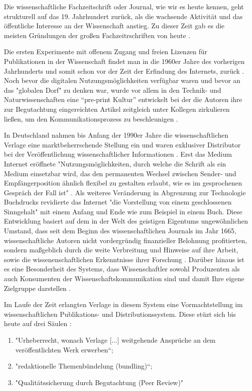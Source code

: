 Die wissenschaftliche Fachzeitschrift oder Journal, wie wir es heute kennen, geht strukturell auf das 19. Jahrhundert zurück, als die wachsende Aktivität und das öffentliche Interesse an der Wissenschaft anstieg. Zu dieser Zeit gab es die meisten Gründungen der großen Fachzeitrschriften von heute \cite{porter_1964_scientific}.

Die ersten Experimente mit offenem Zugang und freien Lizenzen für Publikationen in der Wissenschaft findet man in die 1960er Jahre des vorherigen Jahrhunderts und somit schon vor der Zeit der Erfindung des Internets, zurück \cite{cite:18b}. Noch bevor die digitalen Nutzungsmöglichkeiten verfügbar waren und bevor an das "globalen Dorf"\cite{mcluhan_1962_gutenberg} zu denken war, wurde vor allem in den Technik- und Naturwissenschaften eine “pre-print Kultur” entwickelt bei der die Autoren ihre zur Begutachtung eingereichten Artikel zeitgleich unter Kollegen zirkulieren ließen, um den Kommunikationsprozess zu beschleunigen \cite{suchen-Hoffmann-Zugang-undVerwertung-öffentlicher-Informationen}. 

In Deutschland nahmen bis Anfang der 1990er Jahre die wissenschaftlichen Verlage eine marktbeherrschende Stellung ein und waren exklusiver Distributor bei der Veröffentlichung wissenschaftlicher Informationen \cite{schloegl_2005} \cite{offhaus_2012_institutionelle_repos}. Erst das Medium Internet eröffnete "Nutzungsmöglichkeiten, durch welche die Schrift als ein Medium einsetzbar wird, das den permanenten Wechsel zwischen Sender- und Empfängerposition ähnlich flexibel zu gestalten erlaubt, wie es im gesprochenen Gespräch der Fall ist" \cite{sandbothe_2000_pragmatische}. Als weiteres Veränderung in Abgrenzung zur Technologie Buchdrucks revidierte das Internet "die Vorstellung von einem geschlossenen Sinngehalt" \cite{sandbothe_2000_pragmatische} mit einem Anfang und Ende wie zum Beispiel in einem Buch. Diese Entwicklung basiert auf dem in der Welt des geistigen Eigentums ungewöhnlichen Umstand, dass seit dem Beginn des wissenschaftlichen Journals im Jahr 1665, wissenschaftliche Autoren nicht vordergründig finanzieller Belohnung profitierten, sondern maßgeblich durch die weite Verbreitung und Hinweise auf ihre Arbeit, sowie die wissenenschaftlichen Erkenntnisse ihrer Forschung \cite{albert_2006_open_implications}. Darüber hinaus ist es eine Besonderheit des Systems, dass Wissenschaftler sowohl Produzenten als auch Konsumenten der Wissenschaftskommunikation sind und damit Ihre eigene Zielgruppe darstellen \cite{Hess_2006}.

Im Laufe der Zeit erlangten Verlage in diesem System eine Vormachtstellung im wissenschaftlichen Publikations- und Distributionssystem. Diese stüzt sich bis heute auf drei Säulen \cite{offhaus_2012_institutionelle_repos} \cite{bargheer_2006_open}: 
\begin{enumerate}
\item "Urheberrecht, wonach Verlage [...] weitgehende Ansprüche an dem veröffentlichten Werk erwerben“;
\item "redaktionelle Themenbündelung (bundling)“;
\item "Qualitätssicherung durch Begutachtung (Peer Review)"
\end{enumerate}

